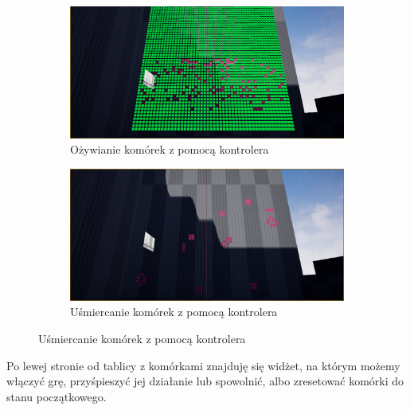 \documentclass[a4paper,12pt,reqno]{article}
\begin{document}
\begin{figure}[H]%
	\centering
	\begin{subfigure}{.5\textwidth}
		\centering
		\includegraphics[width=0.8\linewidth]{graphics/gameoflife/GOLInUE_1.png}
		\caption{Ożywianie komórek z pomocą kontrolera}	
		\label{ref:subref_a}
	\end{subfigure}%
	\begin{subfigure}{.5\textwidth}
		\centering
		\includegraphics[width=0.8\linewidth]{graphics/gameoflife/GOLInUE_2.png}
		\caption{Uśmiercanie komórek z pomocą kontrolera}
		\label{ref:subref_b}
	\end{subfigure}%
\label{ref:ref}
\end{figure}

Po lewej stronie od tablicy z komórkami znajduję się widżet, na którym możemy włączyć grę, przyśpieszyć jej działanie lub spowolnić, albo zresetować komórki do stanu początkowego. 
\end{document}
